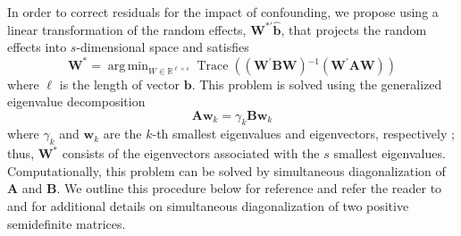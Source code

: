 \documentclass[12pt]{article} %
\newcommand{\al}[1]{{\color{red} #1}}
\newcommand{\inv}{\ensuremath{^{-1}}}
\newcommand{\ginv}{\ensuremath{^{-}}}
\newcommand{\trans}{\ensuremath{^\prime}}
\DeclareMathOperator{\tr}{Trace}
\DeclareMathOperator*{\argmin}{arg\,min}
\begin{document}
In order to correct residuals for the impact of confounding, we propose using a linear transformation of the random effects, $\bm{W}^{*\prime} \widehat{\bm{b}}$, that projects the random effects into $s$-dimensional space and satisfies
\begin{equation}\label{eq:minimize}
\bm{W}^* = \argmin_{W \in \mathbb{R}^{\ell \times s} } 
\tr\left( \left(\bm{W\trans B W} \right)\inv \left(\bm{W\trans A W}\right) \right)
\end{equation}
where $\ell$ is the length of vector $\bm{b}$. %
\al{This problem is solved using the generalized eigenvalue decomposition
\begin{equation}\label{eq:geigen}
	\bm{Aw}_k = \gamma_k \bm{Bw}_k
\end{equation}
where $\gamma_k$ and $\bm{w}_k$ are the $k$-th smallest eigenvalues and eigenvectors, respectively \citep{Fukunaga:1990}; thus, $\bm{W}^*$ consists of the eigenvectors associated with the $s$ smallest eigenvalues. Computationally, this problem can be solved by simultaneous diagonalization of $\bm{A}$ and $\bm{B}$. We outline this procedure below for reference and refer the reader to \cite{McDonald:1979ca} and \cite{deLeeuw:1982to} for additional details on simultaneous diagonalization of two positive semidefinite matrices.\\}
\end{document}
